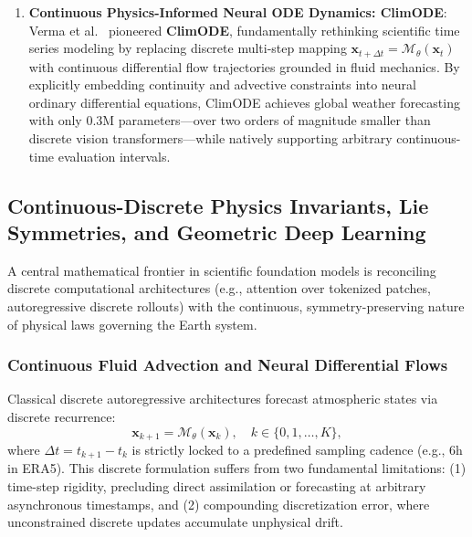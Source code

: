 \begin{enumerate}
    \begin{equation}
        \frac{\partial \mathbf{X}}{\partial t} = \mathcal{F}_{\text{dynamical}}(\mathbf{X}) + \mathcal{N}_{\theta}(\mathbf{X}),
    \end{equation}
    where $\mathcal{F}_{\text{dynamical}}$ executes analytical fluid dynamics, while the neural network $\mathcal{N}_{\theta}$ parameterizes sub-grid physical processes. NeuralGCM demonstrates unprecedented multi-decadal stability without climate drift, matching the operational deterministic accuracy of ECMWF IFS HRES at 1--10 day weather horizons while preserving global physical conservation laws for decadal climate simulations.
    \item \textbf{Continuous Physics-Informed Neural ODE Dynamics: ClimODE}: Verma et al.~\cite{verma2024climode} pioneered \textbf{ClimODE}, fundamentally rethinking scientific time series modeling by replacing discrete multi-step mapping $\mathbf{x}_{t+\Delta t} = \mathcal{M}_\theta(\mathbf{x}_t)$ with continuous differential flow trajectories grounded in fluid mechanics. By explicitly embedding continuity and advective constraints into neural ordinary differential equations, ClimODE achieves global weather forecasting with only 0.3M parameters---over two orders of magnitude smaller than discrete vision transformers---while natively supporting arbitrary continuous-time evaluation intervals.
\end{enumerate}

\subsection{Continuous-Discrete Physics Invariants, Lie Symmetries, and Geometric Deep Learning}
\label{sec:continuous_discrete_physics}
A central mathematical frontier in scientific foundation models is reconciling discrete computational architectures (e.g., attention over tokenized patches, autoregressive discrete rollouts) with the continuous, symmetry-preserving nature of physical laws governing the Earth system.

\subsubsection{Continuous Fluid Advection and Neural Differential Flows}
Classical discrete autoregressive architectures forecast atmospheric states via discrete recurrence:
\begin{equation}
    \mathbf{x}_{k+1} = \mathcal{M}_\theta(\mathbf{x}_k), \quad k \in \{0, 1, \dots, K\},
\end{equation}
where $\Delta t = t_{k+1} - t_k$ is strictly locked to a predefined sampling cadence (e.g., $6\text{h}$ in ERA5). This discrete formulation suffers from two fundamental limitations: (1) time-step rigidity, precluding direct assimilation or forecasting at arbitrary asynchronous timestamps, and (2) compounding discretization error, where unconstrained discrete updates accumulate unphysical drift.

